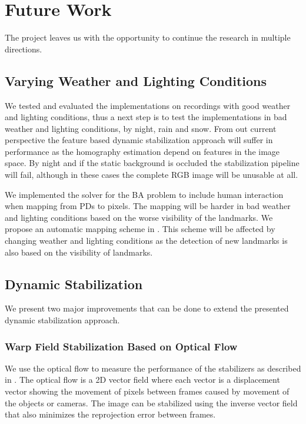 
\section{Future Work}
The project leaves us with the opportunity to continue the research in multiple directions.

\subsection{Varying Weather and Lighting Conditions}
We tested and evaluated the implementations on recordings with good weather and lighting conditions, thus a next step is to test the implementations in bad weather and lighting conditions, \eg by night, rain and snow.
From out current perspective the feature based dynamic stabilization approach will suffer in performance as the homography estimation depend on features in the image space. 
By night and if the static background is occluded the stabilization pipeline will fail, although in these cases the complete RGB image will be unusable at all.

We implemented the solver for the BA problem to include human interaction when mapping from PDs to pixels.
The mapping will be harder in bad weather and lighting conditions based on the worse visibility of the landmarks.
We propose an automatic mapping scheme in .
This scheme will be affected by changing weather and lighting conditions as the detection of new landmarks is also based on the visibility of landmarks.


\subsection{Dynamic Stabilization}
We present two major improvements that can be done to extend the presented dynamic stabilization approach.

\subsubsection{Warp Field Stabilization Based on Optical Flow}
We use the optical flow to measure the performance of the stabilizers as described in  .
The optical flow is a 2D vector field where each vector is a displacement vector showing the movement of pixels between frames caused by movement of the objects or cameras.
The image can be stabilized using the inverse vector field that also minimizes the reprojection error between frames.

